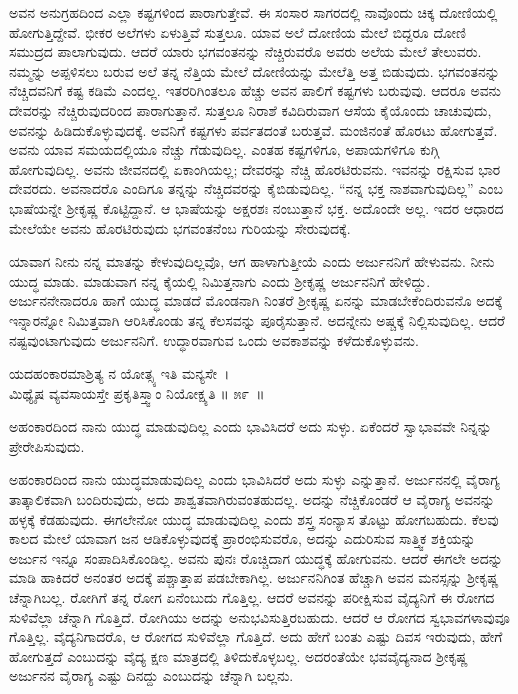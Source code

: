 ಅವನ ಅನುಗ್ರಹದಿಂದ ಎಲ್ಲಾ ಕಷ್ಟಗಳಿಂದ ಪಾರಾಗುತ್ತೇವೆ. ಈ ಸಂಸಾರ ಸಾಗರದಲ್ಲಿ ನಾವೊಂದು ಚಿಕ್ಕ ದೋಣಿಯಲ್ಲಿ ಹೋಗುತ್ತಿದ್ದೇವೆ. ಭೀಕರ ಅಲೆಗಳು ಏಳುತ್ತಿವೆ ಸುತ್ತಲೂ. ಯಾವ ಅಲೆ ದೋಣಿಯ ಮೇಲೆ ಬಿದ್ದರೂ ದೋಣಿ ಸಮುದ್ರದ ಪಾಲಾಗುವುದು. ಆದರೆ ಯಾರು ಭಗವಂತನನ್ನು ನೆಚ್ಚಿರುವರೊ ಅವರು ಅಲೆಯ ಮೇಲೆ ತೇಲುವರು. ನಮ್ಮನ್ನು ಅಪ್ಪಳಿಸಲು ಬರುವ ಅಲೆ ತನ್ನ ನೆತ್ತಿಯ ಮೇಲೆ ದೋಣಿಯನ್ನು ಮೇಲೆತ್ತಿ ಅತ್ತ ಬಿಡುವುದು. ಭಗವಂತನನ್ನು ನೆಚ್ಚಿದವನಿಗೆ ಕಷ್ಟ ಕಡಿಮೆ ಎಂದಲ್ಲ. ಇತರರಿಗಿಂತಲೂ ಹೆಚ್ಚು ಅವನ ಪಾಲಿಗೆ ಕಷ್ಟಗಳು ಬರುವುವು. ಆದರೂ ಅವನು ದೇವರನ್ನು ನೆಚ್ಚಿರುವುದರಿಂದ ಪಾರಾಗುತ್ತಾನೆ. ಸುತ್ತಲೂ ನಿರಾಶೆ ಕವಿದಿರುವಾಗ ಆಸೆಯ ಕೈಯೊಂದು ಚಾಚುವುದು, ಅವನನ್ನು ಹಿಡಿದುಕೊಳ್ಳುವುದಕ್ಕೆ. ಅವನಿಗೆ ಕಷ್ಟಗಳು ಪರ್ವತದಂತೆ ಬರುತ್ತವೆ. ಮಂಜಿನಂತೆ ಹೊರಟು ಹೋಗುತ್ತವೆ. ಅವನು ಯಾವ ಸಮಯದಲ್ಲಿಯೂ ನೆಚ್ಚು ಗೆಡುವುದಿಲ್ಲ. ಎಂತಹ ಕಷ್ಟಗಳಿಗೂ, ಅಪಾಯಗಳಿಗೂ ಕುಗ್ಗಿ ಹೋಗುವುದಿಲ್ಲ. ಅವನು ಜೀವನದಲ್ಲಿ ಏಕಾಂಗಿಯಲ್ಲ; ದೇವರನ್ನು ನೆಚ್ಚಿ ಹೊರಟಿರುವನು. ಇವನನ್ನು ರಕ್ಷಿಸುವ ಭಾರ ದೇವರದು. ಅವನಾದರೊ ಎಂದಿಗೂ ತನ್ನನ್ನು ನೆಚ್ಚಿದವರನ್ನು ಕೈಬಿಡುವುದಿಲ್ಲ. “ನನ್ನ ಭಕ್ತ ನಾಶವಾಗುವುದಿಲ್ಲ” ಎಂಬ ಭಾಷೆಯನ್ನೇ ಶ‍್ರೀಕೃಷ್ಣ ಕೊಟ್ಟಿದ್ದಾನೆ. ಆ ಭಾಷೆಯನ್ನು ಅಕ್ಷರಶಃ ನಂಬುತ್ತಾನೆ ಭಕ್ತ. ಅದೊಂದೇ ಅಲ್ಲ. ಇದರ ಆಧಾರದ ಮೇಲೆಯೇ ಅವನು ಹೊರಟಿರುವುದು ಭಗವಂತನೆಂಬ ಗುರಿಯನ್ನು ಸೇರುವುದಕ್ಕೆ.

ಯಾವಾಗ ನೀನು ನನ್ನ ಮಾತನ್ನು ಕೇಳುವುದಿಲ್ಲವೊ, ಆಗ ಹಾಳಾಗುತ್ತೀಯೆ ಎಂದು ಅರ್ಜುನನಿಗೆ ಹೇಳುವನು. ನೀನು ಯುದ್ಧ ಮಾಡು. ಮಾಡುವಾಗ ನನ್ನ ಕೈಯಲ್ಲಿ ನಿಮಿತ್ತನಾಗು ಎಂದು ಶ‍್ರೀಕೃಷ್ಣ ಅರ್ಜುನನಿಗೆ ಹೇಳಿದ್ದು. ಅರ್ಜುನನೇನಾದರೂ ಹಾಗೆ ಯುದ್ಧ ಮಾಡದೆ ಮೊಂಡನಾಗಿ ನಿಂತರೆ ಶ‍್ರೀಕೃಷ್ಣ ಏನನ್ನು ಮಾಡಬೇಕೆಂದಿರುವನೊ ಅದಕ್ಕೆ ಇನ್ನಾರನ್ನೋ ನಿಮಿತ್ತವಾಗಿ ಆರಿಸಿಕೊಂಡು ತನ್ನ ಕೆಲಸವನ್ನು ಪೂರೈಸುತ್ತಾನೆ. ಅದನ್ನೇನು ಅಷ್ಚಕ್ಕೆ ನಿಲ್ಲಿಸುವುದಿಲ್ಲ. ಆದರೆ ನಷ್ಟವುಂಟಾಗುವುದು ಅರ್ಜುನನಿಗೆ. ಉದ್ಧಾರವಾಗುವ ಒಂದು ಅವಕಾಶವನ್ನು ಕಳೆದು\-ಕೊಳ್ಳುವನು.

\begin{shloka}
ಯದಹಂಕಾರಮಾಶ್ರಿತ್ಯ ನ ಯೋತ್ಸ್ಯ ಇತಿ ಮನ್ಯಸೇ~।\\ಮಿಥ್ಯೈಷ ವ್ಯವಸಾಯಸ್ತೇ ಪ್ರಕೃತಿಸ್ತ್ವಾಂ ನಿಯೋಕ್ಷ್ಯತಿ \hfill॥ ೫೯~॥
\end{shloka}

\begin{artha}
ಅಹಂಕಾರದಿಂದ ನಾನು ಯುದ್ಧ ಮಾಡುವುದಿಲ್ಲ ಎಂದು ಭಾವಿಸಿದರೆ ಅದು ಸುಳ್ಳು. ಏಕೆಂದರೆ ಸ್ವಾಭಾವವೇ ನಿನ್ನನ್ನು ಪ್ರೇರೇಪಿಸುವುದು.
\end{artha}

ಅಹಂಕಾರದಿಂದ ನಾನು ಯುದ್ಧಮಾಡುವುದಿಲ್ಲ ಎಂದು ಭಾವಿಸಿದರೆ ಅದು ಸುಳ್ಳು ಎನ್ನುತ್ತಾನೆ. ಅರ್ಜುನನಲ್ಲಿ ವೈರಾಗ್ಯ ತಾತ್ಕಾಲಿಕವಾಗಿ ಬಂದಿರುವುದು, ಅದು ಶಾಶ್ವತವಾಗಿರುವಂತಹು\-ದಲ್ಲ. ಅದನ್ನು ನೆಚ್ಚಿಕೊಂಡರೆ ಆ ವೈರಾಗ್ಯ ಅವನನ್ನು ಹಳ್ಳಕ್ಕೆ ಕೆಡಹುವುದು. ಈಗಲೇನೋ ಯುದ್ಧ ಮಾಡುವುದಿಲ್ಲ ಎಂದು ಶಸ್ತ್ರ ಸಂನ್ಯಾಸ ತೊಟ್ಟು ಹೋಗಬಹುದು. ಕೆಲವು ಕಾಲದ ಮೇಲೆ ಯಾವಾಗ ಜನ ಆಡಿಕೊಳ್ಳುವುದಕ್ಕೆ ಪ್ರಾರಂಭಿಸುವರೊ, ಅದನ್ನು ಎದುರಿಸುವ ಸಾತ್ತ್ವಿಕ ಶಕ್ತಿಯನ್ನು ಅರ್ಜುನ ಇನ್ನೂ ಸಂಪಾದಿಸಿಕೊಂಡಿಲ್ಲ. ಅವನು ಪುನಃ ರೊಚ್ಚಿದಾಗ ಯುದ್ಧಕ್ಕೆ ಹೋಗುವನು. ಆದರೆ ಈಗಲೇ ಅದನ್ನು ಮಾಡಿ ಹಾಕಿದರೆ ಅನಂತರ ಅದಕ್ಕೆ ಪಶ್ಚಾತ್ತಾಪ ಪಡಬೇಕಾಗಿಲ್ಲ. ಅರ್ಜುನನಿಗಿಂತ ಹೆಚ್ಚಾಗಿ ಅವನ ಮನಸ್ಸನ್ನು ಶ‍್ರೀಕೃಷ್ಣ ಚೆನ್ನಾಗಿಬಲ್ಲ. ರೋಗಿಗೆ ತನ್ನ ರೋಗ ಏನೆಂಬುದು ಗೊತ್ತಿಲ್ಲ. ಆದರೆ ಅವನನ್ನು ಪರೀಕ್ಷಿಸುವ ವೈದ್ಯನಿಗೆ ಈ ರೋಗದ ಸುಳಿವೆಲ್ಲಾ ಚೆನ್ನಾಗಿ ಗೊತ್ತಿದೆ. ರೋಗಿಯು ಅದನ್ನು ಅನುಭವಿಸುತ್ತಿರಬಹುದು. ಆದರೆ ಆ ರೋಗದ ಸ್ವಭಾವಗಳಾವುವೂ ಗೊತ್ತಿಲ್ಲ. ವೈದ್ಯನಿಗಾದರೊ, ಆ ರೋಗದ ಸುಳಿವೆಲ್ಲಾ ಗೊತ್ತಿದೆ. ಅದು ಹೇಗೆ ಬಂತು ಎಷ್ಟು ದಿವಸ ಇರುವುದು, ಹೇಗೆ ಹೋಗುತ್ತದೆ ಎಂಬುದನ್ನು ವೈದ್ಯ ಕ್ಷಣ ಮಾತ್ರದಲ್ಲಿ ತಿಳಿದುಕೊಳ್ಳಬಲ್ಲ. ಅದರಂತೆಯೇ ಭವವೈದ್ಯನಾದ ಶ‍್ರೀಕೃಷ್ಣ ಅರ್ಜುನನ ವೈರಾಗ್ಯ ಎಷ್ಟು ದಿನದ್ದು ಎಂಬುದನ್ನು ಚೆನ್ನಾಗಿ ಬಲ್ಲನು.


